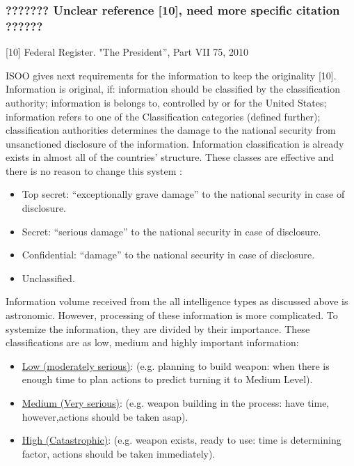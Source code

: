 \documentclass{report}
\begin{document}
\subsubsection{??????? Unclear reference [10], need more specific citation  ??????}
[10] Federal Register. "The President”, Part VII 75, 2010


ISOO gives next requirements for the information to keep the originality [10]. Information is original, if: information should be classified by the classification authority; information is belongs to, controlled by or for the United States; information refers to one of the Classification categories (defined further); classification authorities determines the damage to the national security from unsanctioned disclosure of the information.  Information classification is already exists in almost all of the countries’ structure. These classes are effective and there is no reason to change this system \cite{Richelson2011}:

\begin{itemize}
  \item Top secret: \enquote{exceptionally grave damage} to the national security in case of disclosure.
  \item Secret: \enquote{serious damage} to the national security in case of disclosure.
  \item Confidential: \enquote{damage} to the national security in case of disclosure.
  \item Unclassified.
\end{itemize}


Information volume received from the all intelligence types as discussed above is astronomic. However, processing of these information is more complicated. To systemize the information,  they are divided by their importance. These classifications are as low, medium and highly important information:

\begin{itemize}
  \item \underline{Low (moderately serious)}: (e.g. planning to build weapon: when there is enough time to plan actions to predict turning it to Medium Level).
  \item \underline{Medium (Very serious)}: (e.g. weapon building in the process: have time, however,actions should be taken asap).
  \item \underline{High (Catastrophic)}: (e.g. weapon exists, ready to use: time is determining factor, actions should be taken immediately).
\end{itemize}
\end{document}
